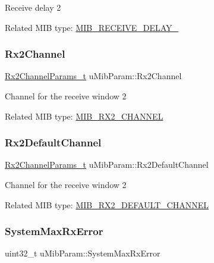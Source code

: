 Receive delay 2

Related M\+IB type\+: \hyperlink{group__LORAMAC_gga32ea83d13a3f5bb4b3ec2ace2319ab61a3d147bf887f0d7317cb2930335857000}{M\+I\+B\+\_\+\+R\+E\+C\+E\+I\+V\+E\+\_\+\+D\+E\+L\+A\+Y\+\_} \mbox{\label{unionuMibParam_af2e450398d3e72d7dc9d95fc54e1574e}} 
\subsubsection{\texorpdfstring{Rx2\+Channel}{Rx2Channel}}
{\footnotesize\ttfamily \hyperlink{group__LORAMAC_ga8f57f29481ea92c24f6af04b96a95e0f}{Rx2\+Channel\+Params\+\_\+t} u\+Mib\+Param\+::\+Rx2\+Channel}

Channel for the receive window 2

Related M\+IB type\+: \hyperlink{group__LORAMAC_gga32ea83d13a3f5bb4b3ec2ace2319ab61a60fe29749b57c7a5315e9c1475269ba3}{M\+I\+B\+\_\+\+R\+X2\+\_\+\+C\+H\+A\+N\+N\+EL} \mbox{\label{unionuMibParam_a9f0e695c27a48c27895fadc99813eb44}} 
\subsubsection{\texorpdfstring{Rx2\+Default\+Channel}{Rx2DefaultChannel}}
{\footnotesize\ttfamily \hyperlink{group__LORAMAC_ga8f57f29481ea92c24f6af04b96a95e0f}{Rx2\+Channel\+Params\+\_\+t} u\+Mib\+Param\+::\+Rx2\+Default\+Channel}

Channel for the receive window 2

Related M\+IB type\+: \hyperlink{group__LORAMAC_gga32ea83d13a3f5bb4b3ec2ace2319ab61ac3a212e314ab58f78007ce812187179d}{M\+I\+B\+\_\+\+R\+X2\+\_\+\+D\+E\+F\+A\+U\+L\+T\+\_\+\+C\+H\+A\+N\+N\+EL} \mbox{\label{unionuMibParam_a2f01cc5ba9dc1ae1a0a9ecb5ece418e5}} 
\subsubsection{\texorpdfstring{System\+Max\+Rx\+Error}{SystemMaxRxError}}
{\footnotesize\ttfamily uint32\+\_\+t u\+Mib\+Param\+::\+System\+Max\+Rx\+Error}

